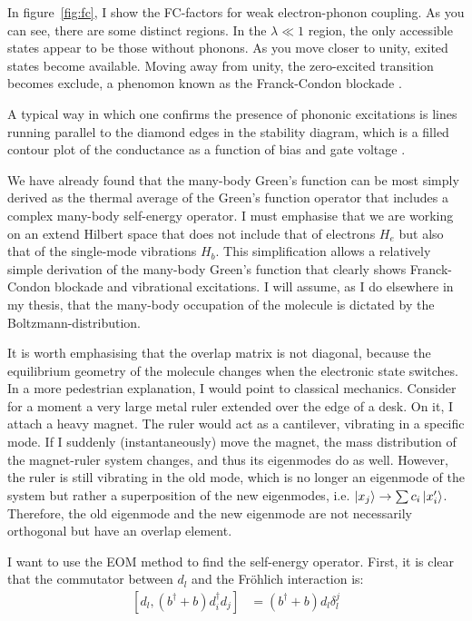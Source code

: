 In figure~\ref{fig:fc}, I show the FC-factors for weak electron-phonon coupling. As you can see, there are some distinct regions. In the $\lambda\ll 1$ region, the only accessible states appear to be those without phonons. As you move closer to unity, exited states become available. Moving away from unity, the zero-excited transition becomes exclude, a phenomon known as the Franck-Condon blockade \cite{fcblockade}.

A typical way in which one confirms the presence of phononic excitations is lines running parallel to the diamond edges in the stability diagram, which is a filled contour plot of the conductance as a function of bias and gate voltage \cite{vibrationcomputation}.

We have already found that the many-body Green's function can be most simply derived as the thermal average of the Green's function operator that includes a complex many-body self-energy operator. I must emphasise that we are working on an extend Hilbert space that does not include that of electrons $H_e$ but also that of the single-mode vibrations $H_b$. This simplification allows a relatively simple derivation of the many-body Green's function that clearly shows Franck-Condon blockade and vibrational excitations. I will assume, as I do elsewhere in my thesis, that the many-body occupation of the molecule is dictated by the Boltzmann-distribution.


It is worth emphasising that the overlap matrix is not diagonal, because the equilibrium geometry of the molecule changes when the electronic state switches. In a more pedestrian explanation, I would point to classical mechanics. Consider for a moment a very large metal ruler extended over the edge of a desk. On it, I attach a heavy magnet. The ruler would act as a cantilever, vibrating in a specific mode. If I suddenly (instantaneously) move the magnet, the mass distribution of  the magnet-ruler system changes, and thus its eigenmodes do as well. However, the ruler is still vibrating in the old mode, which is no longer an eigenmode of the system but rather a superposition of the new eigenmodes, i.e. $\ket{x_j} \rightarrow \sum c_i \ket{x'_i}$. Therefore, the old eigenmode and the new eigenmode are not necessarily orthogonal but have an overlap element. 

I want to use the EOM method to find the self-energy operator. First, it is clear that the commutator between $d_l$ and the Fr\"ohlich interaction is:
\begin{align*}
 \left[ d_l, (b^\dagger + b) d_i^\dagger d_j \right] &= (b^\dagger + b) d_l \delta^j_l
\end{align*}

